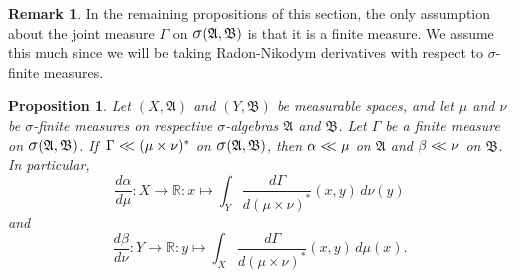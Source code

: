 \documentclass[
twoside=true,
paper=letter,
fontsize=9pt,
pagesize=auto,
leqno,
openany,
headsepline,
overfullrule,
]{scrbook}
\theoremstyle{plain}
\theoremstyle{plain}
\newtheorem{prop}[thm]{Proposition}
\theoremstyle{definition}
\newtheorem{rmk}[thm]{Remark}
\theoremstyle{bfnoteitalic}
\theoremstyle{bfnoteroman}
\newcommand{\sigalg}[1]{\mathfrak{#1}}
\newcommand{\sagb}{\mathop{\hbox{\large{$\sigma$}}}\nolimits}
\newcommand{\textsigma}{\hbox{\large{$\sigma$}}\kern-1pt}
\newcommand{\R}{\mathbb{R}}
\newcommand{\sigmaalgebra}{\sigalg{A}}
\newcommand{\sigmaalgebraii}{\sigalg{B}}
\newcommand{\productsig}[2]{\sagb(#1,#2)}
\newcommand{\measurespace}{X}
\newcommand{\measurespaceii}{Y}
\newcommand{\mspaceelt}{x}
\newcommand{\mspaceeltii}{y}
\newcommand{\abscont}{\mathrel{< \kern-3.5pt <}}
\newcommand{\measure}{\mu}
\newcommand{\measmu}{\mu}
\newcommand{\measureii}{\nu}
\newcommand{\measnu}{\nu}
\newcommand{\joint}{\Gamma}%
\newcommand{\measonprod}{\Gamma}%
\newcommand{\marginalone}{\alpha}%
\newcommand{\marginaltwo}{\beta}%
\begin{document}
\begin{rmk}
In the remaining propositions of this section, the only assumption about the joint measure $\measonprod$ on $\productsig{\sigmaalgebra}{\sigmaalgebraii}$ is that it is a finite measure.  We assume this much since we will be taking Radon-Nikodym derivatives with respect to \textsigma\hyp{}finite measures.
\end{rmk}






\begin{prop}\label{marginal_abscont}
Let 
$(\measurespace, \sigmaalgebra)$
and
$(\measurespaceii, \sigmaalgebraii)$
be measurable spaces, and let $\measure$ and $\measureii$
be \textsigma-finite measures on respective \textsigma-algebras 
$\sigmaalgebra$ and $\sigmaalgebraii$.
Let $\measonprod$ be a finite measure on 
$\productsig{\sigmaalgebra}{\sigmaalgebraii}$. 
If $\,\measonprod \abscont (\measure\times\measureii)^*$ on
$\productsig{\sigmaalgebra}{\sigmaalgebraii}$, 
then 
$\marginalone\abscont\measure$
on $\sigmaalgebra$
and
$\marginaltwo\abscont\measureii$
on $\sigmaalgebraii$.
In particular,
\[
\frac{d \marginalone}
{d\measure}
: \measurespace\to\R :
\mspaceelt\mapsto
\int_{\measurespaceii}
\frac{d\joint}{d(\measmu\times\measnu)^*}
(\mspaceelt,\mspaceeltii)
\,d\measureii(\mspaceeltii)
\]
and
\[
\frac{d \marginaltwo}
{d\measureii}
: \measurespaceii\to\R :
\mspaceeltii\mapsto
\int_{\measurespace}
\frac{d\joint}{d(\measmu\times\measnu)^*}
(\mspaceelt,\mspaceeltii)\,d\measure(\mspaceelt).
\]
\end{prop}
\end{document}
